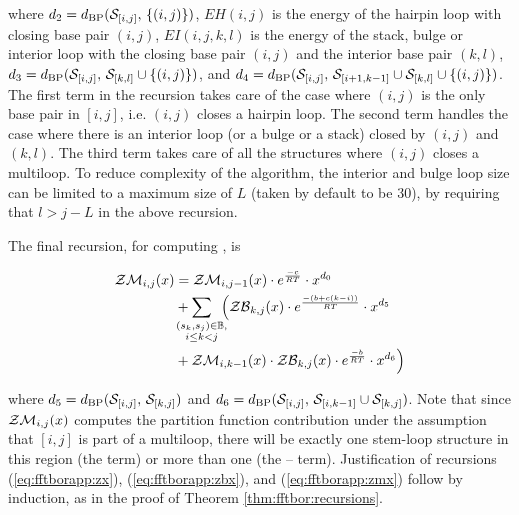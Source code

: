 where $d_2 = d_{\text{BP}}(\mathcal S_{[i,j]},\,\{(i,j)\})$,
$EH(i,j)$ is the energy of the hairpin loop with closing base
pair $(i,j)$, $EI(i,j,k,l)$ is the energy of the stack, bulge or
interior loop with the closing base pair $(i,j)$ and the interior
base pair $(k,l)$, $d_3 = d_{\text{BP}}(\mathcal S_{[i,j]},\,\mathcal S_{[k,l]} \cup
\{(i,j)\})$, and $d_4 = d_{\text{BP}}(\mathcal S_{[i,j]},\,\mathcal S_{[i+1,k-1]} \cup
\mathcal S_{[k,l]} \cup\{(i,j)\})$. The first term in the
recursion takes care of the case where $(i,j)$ is the only base pair
in $[i,j]$, i.e. $(i,j)$ closes a hairpin loop. The second term
handles the case where there is an interior loop (or a bulge or a
stack) closed by $(i,j)$ and $(k,l)$. The third term takes care of
all the structures where $(i,j)$ closes a multiloop. To reduce
complexity of the algorithm, the interior and bulge loop size can be
limited to a maximum size of $L$ (taken by default to be 30),
by requiring that $l>j-L$ in the above recursion.

The final recursion, for computing \emZM{}, is

\begin{align}
\label{eq:fftborapp:zmx}
\begin{split}
\emZM{i,j} &= \emZM{i,j-1} \cdot \boltzE{c} \cdot x^{d_0} \\
&+ \sum_{\mathclap{\substack{(s_k,s_j) \in \bpSet, \\ i \leq k < j }}}\enspace
\Big( \emZB{k,j} \cdot \boltzE{(b+c(k-i))} \cdot x^{d_5} \\
&+ \emZM{i,k-1} \cdot \emZB{k,j} \cdot \boltzE{b} \cdot x^{d_6} \Big)
\end{split}
\end{align}

where $d_5 = d_{\text{BP}}(\mathcal S_{[i,j]},\,\mathcal S_{[k,j]})$ and $d_6
=d_{\text{BP}}(\mathcal S_{[i,j]},\,\mathcal S_{[i,k-1]} \cup \mathcal S_{[k,j]})$.
Note that since $\mathcal{ZM}_{i,j}(x)$ computes the partition function
contribution under the assumption that $[i,j]$ is part of a
multiloop, there will be exactly one stem-loop structure in this
region (the \emZB{} term) or
more than one (the \emZM{}--\emZB{} term).
Justification of recursions (\ref{eq:fftborapp:zx}),
(\ref{eq:fftborapp:zbx}), and
(\ref{eq:fftborapp:zmx})
follow by induction, as in the proof of Theorem \ref{thm:fftbor:recursions}.
